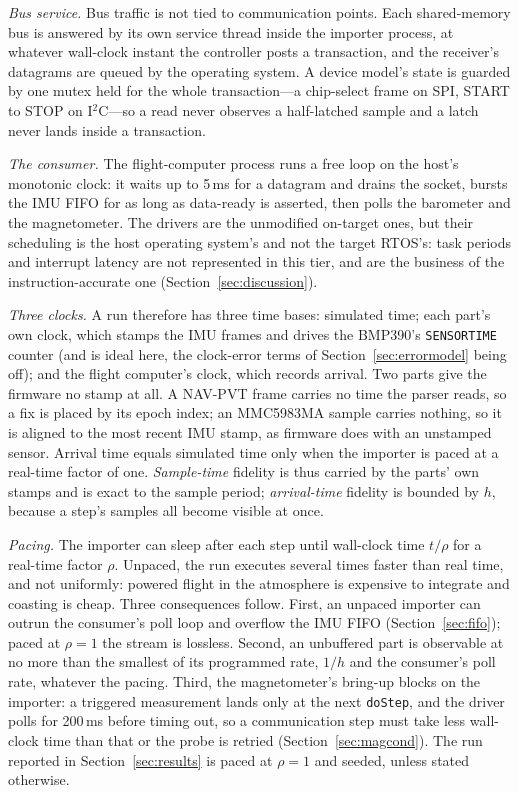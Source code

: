 \documentclass[preprint,12pt,a4paper]{elsarticle}
\newcommand{\code}[1]{\texttt{\small #1}}
\begin{document}
\emph{Bus service.} Bus traffic is not tied to communication points. Each
shared-memory bus is answered by its own service thread inside the importer
process, at whatever wall-clock instant the controller posts a transaction, and
the receiver's datagrams are queued by the operating system. A device model's
state is guarded by one mutex held for the whole transaction---a
chip-select frame on SPI, START to STOP on I$^2$C---so a read never observes a
half-latched sample and a latch never lands inside a transaction.

\emph{The consumer.} The flight-computer process runs a free loop on the host's
monotonic clock: it waits up to 5\,ms for a datagram and drains the socket,
bursts the IMU FIFO for as long as data-ready is asserted, then polls the
barometer and the magnetometer. The drivers are the unmodified on-target ones,
but their scheduling is the host operating system's and not the target RTOS's:
task periods and interrupt latency are not represented in this tier, and are
the business of the instruction-accurate one (Section~\ref{sec:discussion}).

\emph{Three clocks.} A run therefore has three time bases: simulated time; each
part's own clock, which stamps the IMU frames and drives the BMP390's
\code{SENSORTIME} counter (and is ideal here, the clock-error terms of
Section~\ref{sec:errormodel} being off); and the flight computer's clock, which records
arrival. Two parts give the firmware no stamp at all. A NAV-PVT frame carries no
time the parser reads, so a fix is placed by its epoch index; an MMC5983MA
sample carries nothing, so it is aligned to the most recent IMU stamp, as
firmware does with an unstamped sensor. Arrival time equals simulated time only
when the importer is paced at a real-time factor of one. \emph{Sample-time}
fidelity is thus carried by the parts' own stamps and is exact to the sample
period; \emph{arrival-time} fidelity is bounded by $h$, because a step's samples
all become visible at once.

\emph{Pacing.} The importer can sleep after each step until wall-clock time
$t/\rho$ for a real-time factor $\rho$. Unpaced, the run executes several times
faster than real time, and not uniformly: powered flight in the atmosphere is
expensive to integrate and coasting is cheap. Three consequences follow. First, an unpaced importer can outrun the consumer's poll
loop and overflow the IMU FIFO (Section~\ref{sec:fifo}); paced at $\rho=1$ the
stream is lossless. Second, an unbuffered part is observable at no more than
the smallest of its programmed rate, $1/h$ and the consumer's poll rate,
whatever the pacing. Third, the magnetometer's bring-up blocks on the importer:
a triggered measurement lands only at the next \code{doStep}, and the driver
polls for 200\,ms before timing out, so a communication step must take less
wall-clock time than that or the probe is retried
(Section~\ref{sec:magcond}).
The run reported in Section~\ref{sec:results} is paced at $\rho=1$ and seeded,
unless stated otherwise.
\end{document}
